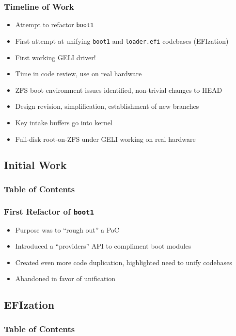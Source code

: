 \documentclass{beamer}
\begin{document}
\begin{frame}
  \frametitle{Timeline of Work}
  \begin{itemize}
  \item Attempt to refactor \texttt{boot1}
  \item First attempt at unifying \texttt{boot1} and
    \texttt{loader.efi} codebases (EFIzation)
  \item First working GELI driver!
  \item Time in code review, use on real hardware
  \item ZFS boot environment issues identified, non-trivial changes to HEAD
  \item Design revision, simplification, establishment of new branches
  \item Key intake buffers go into kernel
  \item Full-disk root-on-ZFS under GELI working on real hardware
  \end{itemize}
\end{frame}

\subsection{Initial Work}

\begin{frame}
  \frametitle{Table of Contents}
  \tableofcontents[currentsection]
\end{frame}

\begin{frame}
  \frametitle{First Refactor of \texttt{boot1}}
  \begin{itemize}
  \item Purpose was to ``rough out'' a PoC
  \item Introduced a ``providers'' API to compliment boot modules
  \item Created even more code duplication, highlighted need to unify codebases
  \item Abandoned in favor of unification
  \end{itemize}
\end{frame}

\subsection{EFIzation}

\begin{frame}
  \frametitle{Table of Contents}
  \tableofcontents[currentsection]
\end{frame}
\end{document}
